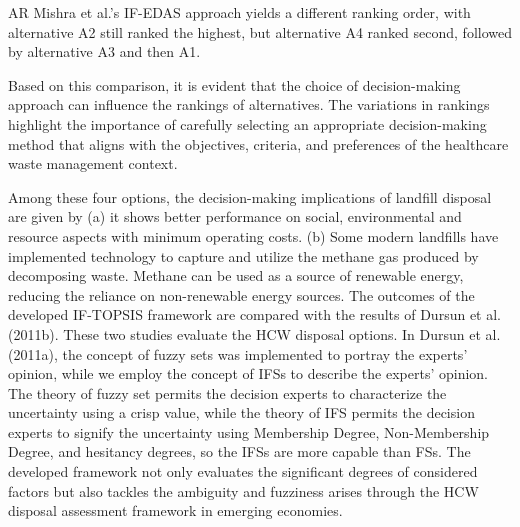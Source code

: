 \begin{flushleft}
AR Mishra et al.'s IF-EDAS approach yields a different ranking order, with alternative A2 still ranked the highest, but alternative A4 ranked second, followed by alternative A3 and then A1.

\vspace{3mm}

Based on this comparison, it is evident that the choice of decision-making approach can influence the rankings of alternatives. The variations in rankings highlight the importance of carefully selecting an appropriate decision-making method that aligns with the objectives, criteria, and preferences of the healthcare waste management context.

\vspace{0.3cm}
\newline
Among these four options, the decision-making implications
of landfill disposal are given by (a) it shows better
performance on social, environmental and resource aspects with
minimum operating costs. (b) Some modern landfills have implemented technology to capture and utilize the methane gas produced by decomposing waste. Methane can be used as a source of renewable energy, reducing the reliance on non-renewable energy sources.
\vspace{0.3cm}
\newline
The outcomes of the developed IF-TOPSIS framework are
compared with the results of  Dursun et al. (2011b)\cite{3}. These two
studies evaluate the HCW disposal options. In  Dursun et al. (2011a)\cite{4},
the concept of fuzzy sets was implemented to portray the experts’
opinion, while we employ the concept of IFSs to describe the experts’
opinion. The theory of fuzzy set permits the decision experts
to characterize the uncertainty using a crisp value, while the theory
of IFS permits the decision experts to signify the uncertainty using
Membership Degree, Non-Membership Degree, and hesitancy degrees, so the IFSs are more capable than
FSs. The developed framework not only evaluates the significant
degrees of considered factors but also tackles the ambiguity and
fuzziness arises through the HCW disposal assessment framework
in emerging economies.
\end{flushleft}
